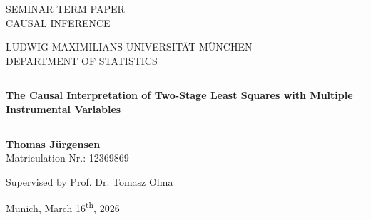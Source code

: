 \begin{titlepage}
\begin{center}

\Large
SEMINAR TERM PAPER\\
CAUSAL INFERENCE

\vspace{0.5cm}
\Large
LUDWIG-MAXIMILIANS-UNIVERSITÄT MÜNCHEN\\
DEPARTMENT OF STATISTICS

\vspace{0.5cm}

\rule{\textwidth}{1.5pt}
\LARGE
\textbf{The Causal Interpretation of Two-Stage Least Squares with Multiple Instrumental Variables}
\rule{\textwidth}{1.5pt}

\vspace{0.5cm}

\Large
\textbf{Thomas Jürgensen}\\
\large
Matriculation Nr.: 12369869

\vspace{0.5cm}

Supervised by Prof. Dr. Tomasz Olma

\vspace{0.5cm}

\large
Munich, March 16\textsuperscript{th}, 2026
      
\vspace{0.5cm}



\vfill

\end{center}
\end{titlepage}
\newpage
\newpage
